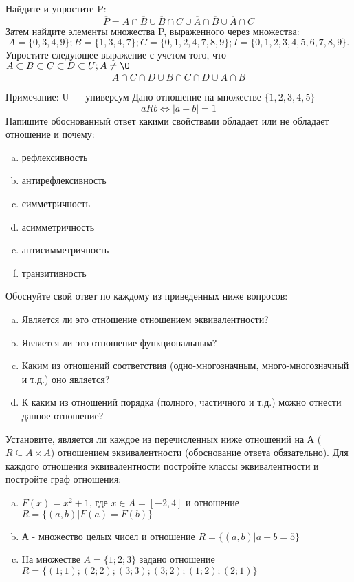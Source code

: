 \documentclass[10pt]{exam}
\begin{document}
\begin{questions}
\question
Найдите и упростите P:
\begin{equation*}
\overline{P} = A \cap \overline{B} \cup \overline{B} \cap C \cup \overline{A} \cap \overline{B} \cup \overline{A} \cap C
\end{equation*}
Затем найдите элементы множества P, выраженного через множества:
\begin{equation*}
A = \{0, 3, 4, 9\}; 
B = \{1, 3, 4, 7\};
C = \{0, 1, 2, 4, 7, 8, 9\};
I = \{0, 1, 2, 3, 4, 5, 6, 7, 8, 9\}.
\end{equation*}\question
Упростите следующее выражение с учетом того, что $A\subset B \subset C \subset D \subset U; A \neq \O$
\begin{equation*}
\overline{A} \cap \overline{C} \cap D \cup \overline{B} \cap \overline{C} \cap D \cup A \cap B
\end{equation*}

Примечание: U — универсум\question
Дано отношение на множестве $\{1, 2, 3, 4, 5\}$ 
\begin{equation*}
aRb \iff |a-b| = 1
\end{equation*}
Напишите обоснованный ответ какими свойствами обладает или не обладает отношение и почему:   
\begin{enumerate} [a)]\setcounter{enumi}{0}
\item рефлексивность
\item антирефлексивность
\item симметричность
\item асимметричность
\item антисимметричность
\item транзитивность
\end{enumerate}

Обоснуйте свой ответ по каждому из приведенных ниже вопросов:
\begin{enumerate} [a)]\setcounter{enumi}{0}
    \item Является ли это отношение отношением эквивалентности?
    \item Является ли это отношение функциональным?
    \item Каким из отношений соответствия (одно-многозначным, много-многозначный и т.д.) оно является?
    \item К каким из отношений порядка (полного, частичного и т.д.) можно отнести данное отношение?
\end{enumerate}

\question
Установите, является ли каждое из перечисленных ниже отношений на А ($R \subseteq A \times A$) отношением эквивалентности (обоснование ответа обязательно). Для каждого отношения эквивалентности постройте классы эквивалентности и постройте граф отношения:
\begin{enumerate} [a)]\setcounter{enumi}{0}
\item $F(x)=x^{2}+1$, где $x \in A = [-2, 4]$ и отношение $R = \{(a,b)|F(a) = F(b)\}$
\item А - множество целых чисел и отношение $R = \{(a,b)|a + b = 5\}$
\item На множестве $A = \{1; 2; 3\}$ задано отношение $R = \{(1; 1); (2; 2); (3; 3); (3; 2); (1; 2); (2; 1)\}$


\end{enumerate}
\end{questions}
\end{document}
